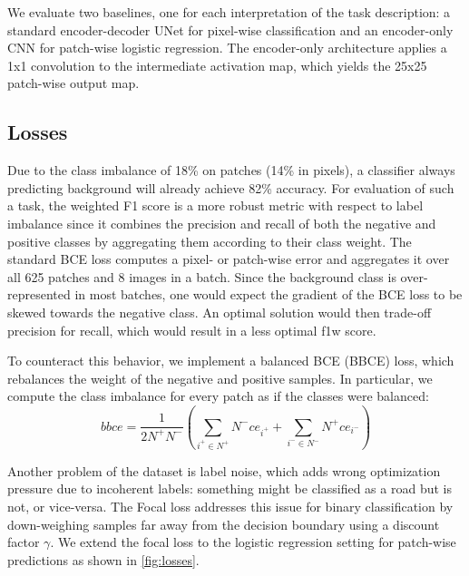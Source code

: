 \documentclass[10pt,conference,compsocconf]{IEEEtran}
\begin{document}
We evaluate two baselines, one for each interpretation of the task description: a standard encoder-decoder UNet for pixel-wise classification and an encoder-only CNN for patch-wise logistic regression. The encoder-only architecture applies a 1x1 convolution to the intermediate activation map, which yields the 25x25 patch-wise output map.

\subsection{Losses}
Due to the class imbalance of 18\% on patches (14\% in pixels), a classifier always predicting background will already achieve 82\% accuracy. For evaluation of such a task, the weighted F1 score is a more robust metric with respect to label imbalance since it combines the precision and recall of both the negative and positive classes by aggregating them according to their class weight. The standard BCE loss computes a pixel- or patch-wise error and aggregates it over all 625 patches and 8 images in a batch. Since the background class is over-represented in most batches, one would expect the gradient of the BCE loss to be skewed towards the negative class. An optimal solution would then trade-off precision for recall, which would result in a less optimal f1w score.

To counteract this behavior, we implement a balanced BCE (BBCE) loss, which rebalances the weight of the negative and positive samples. In particular, we compute the class imbalance for every patch as if the classes were balanced:$$bbce = \frac{1}{2 N^+ N^-} 
(\sum_{i^+ \in N^+} N^- ce_{i^+}  + \sum_{i^- \in N^-} N^+ ce_{i^-})
$$

Another problem of the dataset is label noise, which adds wrong optimization pressure due to incoherent labels: something might be classified as a road but is not, or vice-versa. The Focal loss \cite{focalloss} addresses this issue for binary classification by down-weighing samples far away from the decision boundary using a discount factor $\gamma$. We extend the focal loss to the logistic regression setting for patch-wise predictions as shown in  \autoref{fig:losses}.
\end{document}
